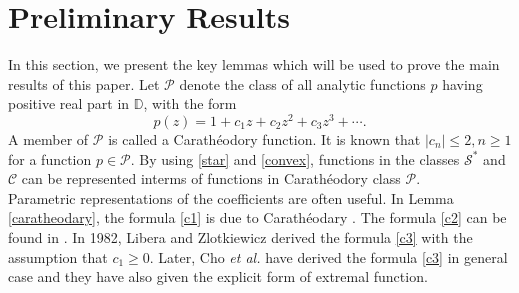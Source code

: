 \documentclass[a4paper,12pt]{amsart}
\theoremstyle{definition}
\numberwithin{equation}{section}
\begin{document}
\section{Preliminary Results}
In this section, we present the key lemmas which will be used to prove the main results of this paper. Let $\mathcal{P}$ denote the class of all analytic functions $p$ having positive real part in $\mathbb{D}$, with the form
\begin{equation}\label{p}
p(z)=1+c_{1} z+c_{2} z^{2}+c_{3} z^{3}+ \cdots .
\end{equation}
A member of $\mathcal{P}$ is called a Carathéodory function. It is known that $\left|c_{n}\right| \leq 2, n \geq 1$ for a function $p \in \mathcal{P}$. By using \eqref{star} and \eqref{convex}, functions in the classes $\mathcal{S}^*$ and $\mathcal{C}$ can be represented interms of functions in Carathéodory class $\mathcal{P}$.
\\[2mm]



Parametric representations of the coefficients are often useful. In Lemma \ref{caratheodary}, the formula \eqref{c1} is due to Carathéodary \cite{Duren-book-1983}. The formula \eqref{c2} can be found in \cite{Pombook}. In 1982, Libera and Zlotkiewicz \cite{LZ1,LZ2} derived the formula \eqref{c3} with the assumption that $c_1 \geq 0$. Later, Cho {\it et al.} \cite{cholecko} have derived the formula \eqref{c3} in general case and they have also given the explicit form of extremal function.
\end{document}
